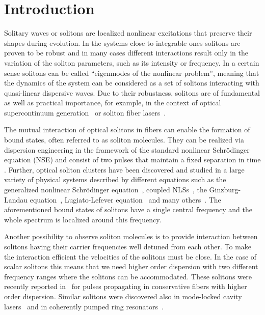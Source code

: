 \documentclass[aps, pra, twocolumn, superscriptaddress, final]{revtex4}
\begin{document}
\maketitle

\section{Introduction}

Solitary waves or solitons are localized nonlinear excitations that preserve
their shapes during evolution. In the systems close to integrable ones solitons
are proven to be robust and in many cases different interactions result
only in the variation of the soliton parameters, such as its intensity or
frequency.
In a certain sense solitons can be called ``eigenmodes of the nonlinear
problem'', meaning that the dynamics of the system can be considered as a set
of solitons interacting with quasi-linear dispersive waves.
Due to their robustness, solitons are of fundamental as well as practical
importance, for example, in the context of optical supercontinuum
generation~\cite{RevModPhys.78.1135, RevModPhys.82.1287,
dudley2010supercontinuum} or soliton fiber
lasers~\cite{Mollenauer:84,Kafka:89,Matsas_1992, Turitsyn_2016}.

The mutual interaction of optical solitons in fibers can enable the formation
of bound states, often referred to as soliton molecules.
%
They can be realized via dispersion engineering in the framework of the
standard nonlinear Schrödinger equation (NSE) and consist of two pulses that
maintain a fixed separation in time \cite{Stratmann:PRL:2005,Hause:PRA:2008}.
%
Further, optical soliton clusters have been discovered and studied in a large
variety of physical systems described by different equations such as the
generalized nonlinear Schr\"odinger equation~\cite{PhysRevE.51.3572,
PhysRevE.47.2874, PhysRevA.80.043829}, coupled NLSs~\cite{Kivshar:89,
Abdullaev:89}, the Ginzburg-Landau
equation~\cite{PhysRevLett.79.4047, Haelterman:97}, Lugiato-Lefever
equation~\cite{Weng_LugiatoLefever} and many others~\cite{Neshev:03,
Afanasjev:94, PhysRevE.67.056610, Chen:00, PhysRevLett.89.273902,
PhysRevLett.122.084101, PhysRevLett.121.023905, PhysRevLett.118.243901,
PhysRevE.86.036606, Grelu_NatPhoton, TURMANOV20151828}.  The aforementioned
bound states of solitons have a single central frequency and the whole spectrum
is localized around this frequency.

Another possibility to observe soliton molecules is to provide interaction
between solitons having their carrier frequencies well detuned from each
other. To make the interaction efficient the velocities of the solitons must be
close. In the case of scalar solitons this means that we need higher order
dispersion with two different frequency ranges where the solitons can be
accommodated. These solitons were recently reported
in~\cite{PhysRevLett.123.243905, PhysRevA.101.043822, Melchert:21,
Melchert_SciRep21} for pulses propagating in conservative fibers with higher
order dispersion. Similar solitons were discovered also in mode-locked cavity
lasers~\cite{Lourdesamy_NaturePhys} and in coherently pumped ring
resonators~\cite{Moille:18, Melchert:20}.
\end{document}
